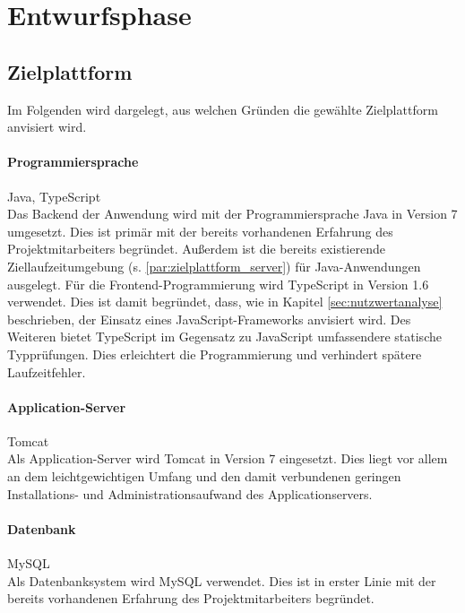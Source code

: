 \documentclass[12pt, xcolor=dvipsnames]{scrartcl}
\begin{document}
\section{Entwurfsphase}

\subsection{Zielplattform}

Im Folgenden wird dargelegt, aus welchen Gründen die gewählte Zielplattform anvisiert wird.

\paragraph{Programmiersprache} Java, TypeScript \\
Das Backend der Anwendung wird mit der Programmiersprache Java in Version 7 umgesetzt.
Dies ist primär mit der bereits vorhandenen Erfahrung des Projektmitarbeiters begründet. Außerdem ist die bereits existierende Ziellaufzeitumgebung (s. \ref{par:zielplattform_server}) für Java-Anwendungen ausgelegt.
Für die Frontend-Programmierung wird TypeScript in Version 1.6 verwendet. Dies ist damit begründet, dass, wie in Kapitel \ref{sec:nutzwertanalyse} beschrieben, der Einsatz eines JavaScript-Frameworks anvisiert wird. Des Weiteren bietet TypeScript im Gegensatz zu JavaScript umfassendere statische Typprüfungen. Dies erleichtert die Programmierung und verhindert spätere Laufzeitfehler.

\paragraph{Application-Server} Tomcat \\
Als Application-Server wird Tomcat in Version 7 eingesetzt. Dies liegt vor allem an dem leichtgewichtigen Umfang und den damit verbundenen geringen Installations- und Administrationsaufwand des Applicationservers. 

\paragraph{Datenbank} MySQL \\
Als Datenbanksystem wird MySQL verwendet. Dies ist in erster Linie mit der bereits vorhandenen Erfahrung des Projektmitarbeiters begründet.
\end{document}
